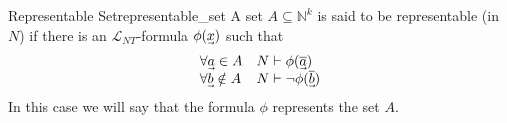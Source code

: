 \begin{definition}
{Representable Set}{representable_set}
A set \(A \subseteq \mathbb{N}^{k}\) is said to be representable (in \(N\)) if
there is an \(\mathcal{L}_{N T}\)-formula \(\phi(\undervec{x})\) such that
\[
\begin{array}
{ll}
\forall \undervec{a} \in A & N \vdash \phi(\overline{\undervec{a}}) \\
\forall \undervec{b} \notin A & N \vdash \neg \phi(\overline{\undervec{b}})
\end{array}
\]
In this case we will say that the formula \(\phi\) represents the set \(A\).
\end{definition}
